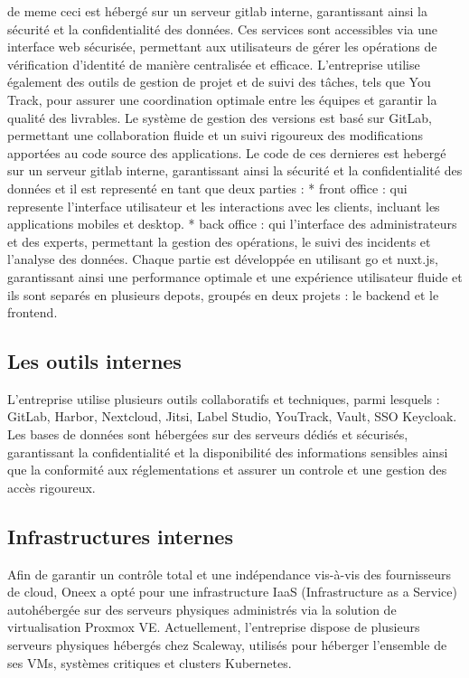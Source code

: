 de meme ceci est hébergé sur un serveur gitlab interne, garantissant ainsi la sécurité et la confidentialité des données.
Ces services sont accessibles via une interface web sécurisée, permettant aux utilisateurs de gérer les opérations de vérification d’identité de manière centralisée et efficace.
L’entreprise utilise également des outils de gestion de projet et de suivi des tâches, tels que You
Track, pour assurer une coordination optimale entre les équipes et garantir la qualité des livrables.
Le système de gestion des versions est basé sur GitLab, permettant une collaboration fluide et un
suivi rigoureux des modifications apportées au code source des applications.
Le code de ces dernieres est hebergé sur un serveur gitlab interne, garantissant ainsi la sécurité et la confidentialité des données et il est representé en tant que deux parties :
* front office : qui represente l'interface utilisateur et les interactions avec les clients, incluant les applications mobiles et desktop.
* back office : qui l'interface des administrateurs et des experts, permettant la gestion des opérations, le suivi des incidents et l'analyse des données.
Chaque partie est développée en utilisant go et nuxt.js, garantissant ainsi une performance optimale et une expérience utilisateur fluide et ils sont separés en plusieurs depots, groupés en deux projets : le backend et le frontend.

\subsection{Les outils internes}

L’entreprise utilise plusieurs outils collaboratifs et techniques, parmi lesquels :
GitLab, Harbor, Nextcloud, Jitsi, Label Studio, YouTrack, Vault, SSO Keycloak.
Les bases de données sont hébergées sur des serveurs dédiés et sécurisés, garantissant la confidentialité et la disponibilité des informations sensibles ainsi que la conformité aux réglementations et assurer un controle et une gestion des accès rigoureux.

\subsection{Infrastructures internes}

Afin de garantir un contrôle total et une indépendance vis-à-vis des fournisseurs de cloud, Oneex a opté pour une infrastructure IaaS (Infrastructure as a Service) autohébergée sur des serveurs physiques administrés via la solution de virtualisation Proxmox VE.
Actuellement, l'entreprise dispose de plusieurs serveurs physiques hébergés chez Scaleway, utilisés pour héberger l’ensemble de ses VMs, systèmes critiques et clusters Kubernetes.

